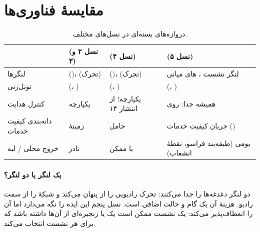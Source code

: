 \documentclass[11pt,a4paper]{article}
\begin{document}
\section{مقایسهٔ فناوری‌ها}
\begin{table}[htbp]
\centering\small
\caption{دروازه‌های بسته‌ای در نسل‌های مختلف.}\label{tab:cmp}
\begin{tabularx}{\linewidth}{@{}l Y Y Y@{}}
\toprule
{} &  (نسل ۲ و ۳) &  (نسل ۴) &  (نسل ۵) \\
\midrule
لنگرها            &  ()،  (تحرک) &  ()،  (تحرک) &  لنگر نشست ، های میانی \\
تونل‌زنی          &  (، )  &  (، ) &  (، ) \\
کنترل هدایت       & یکپارچه                          & یکپارچه؛  از انتشار ۱۴ & همیشه جدا:  روی  \\
دانه‌بندی کیفیت خدمات & زمینهٔ             & حامل                    & جریان کیفیت خدمات () \\
خروج محلی / لبه   & نادر                             & با  ممکن               & بومی (طبقه‌بند فراسو، نقطهٔ انشعاب) \\
\bottomrule
\end{tabularx}
\end{table}

\paragraph{یک لنگر یا دو لنگر؟} دو لنگر دغدغه‌ها را جدا می‌کنند:  تحرک رادیویی را از  پنهان می‌کند و
 شبکهٔ  را از سمت رادیو. هزینهٔ آن یک گام و حالت اضافی است. نسل پنجم این ایده را نگه می‌دارد اما آن را
انعطاف‌پذیر می‌کند: یک نشست ممکن است یک  یا زنجیره‌ای از آن‌ها داشته باشد که  برای هر نشست انتخاب
می‌کند.

\end{document}
